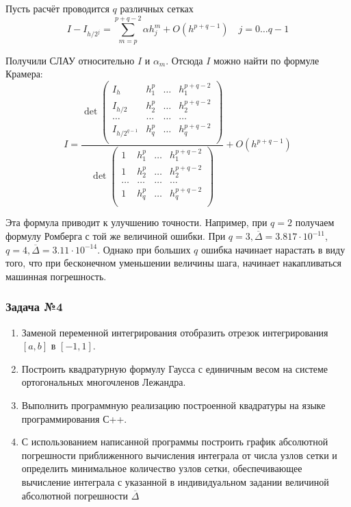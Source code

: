 \documentclass[a4paper, fontsize=14pt]{article}
\begin{document}
Пусть расчёт проводится $q$ различных сетках
\begin{equation*}
    I - I_{h/2^j} = \sum_{m = p}^{p + q - 2} \alpha h^m_j + O(h^{p+q-1}) \quad j = 0 \dots q-1
\end{equation*}

Получили СЛАУ относительно $I$ и $\alpha_m$. Отсюда $I$ можно найти по формуле Крамера:
\begin{equation}
    I = \frac{    \det \begin{pmatrix}
        I_{h}&h_1^p&\dots&h_1^{p+q-2} \\
        I_{h/2}&h_2^p&\dots&h_2^{p+q-2} \\
        \dots&\dots&\dots&\dots \\
        I_{h/2^{q-1}}&h_q^p&\dots&h_q^{p+q-2} \\     
    \end{pmatrix}}{    \det \begin{pmatrix}
        1&h_1^p&\dots&h_1^{p+q-2} \\
        1&h_2^p&\dots&h_2^{p+q-2} \\
        \dots  &\dots&\dots&\dots \\
        1&h_q^p&\dots&h_q^{p+q-2} \\
    \end{pmatrix}} + O(h^{p+q-1})
\end{equation}

Эта формула приводит к улучшению точности. Например, при $q = 2$ получаем формулу Ромберга с той же величиной ошибки. 
При $q = 3, \overline{\Delta} =  3.817 \cdot 10^{-11}$, $q=4, \overline{\Delta} = 3.11 \cdot 10^{-14}$.
Однако при больших $q$ ошибка начинает нарастать в виду того,
что при бесконечном уменьшении величины шага, начинает накапливаться машинная погрешность.
\subsubsection*{Задача №4}
\begin{enumerate}
    \item Заменой переменной интегрирования отобразить отрезок
интегрирования $[a,b]$ в $[-1,1]$.
\item Построить квадратурную формулу Гаусса с единичным весом на
системе ортогональных многочленов Лежандра.
\item Выполнить программную реализацию построенной квадратуры на языке программирования С++.
\item С использованием написанной программы построить график
абсолютной погрешности приближенного вычисления интеграла от
числа узлов сетки и определить минимальное количество узлов сетки,
обеспечивающее вычисление интеграла с указанной в индивидуальном
задании величиной абсолютной погрешности $\overline{\Delta}$
\end{enumerate}
\end{document}

